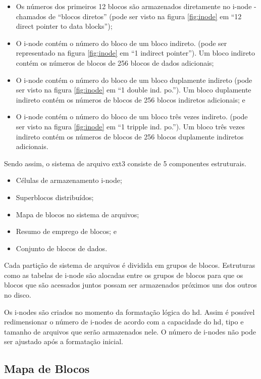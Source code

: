 \begin{itemize}
	\item Os números dos primeiros 12 blocos são armazenados diretamente no i-node - chamados de ``blocos diretos'' (pode ser visto na figura \ref{fig:inode} em ``12 direct pointer to data blocks'');
	\item O i-node contém o número do bloco de um bloco indireto. (pode ser representado na figura \ref{fig:inode} em ``1 indirect pointer''). Um bloco indireto contém os números de blocos de 256 blocos de dados adicionais;
	\item O i-node contém o número do bloco de um bloco duplamente indireto (pode ser visto na figura \ref{fig:inode} em ``1 double ind. po.''). Um bloco duplamente indireto contém os números de blocos de 256 blocos indiretos adicionais; e
	\item O i-node contém o número do bloco de um bloco três vezes indireto. (pode ser visto na figura \ref{fig:inode} em ``1 tripple ind. po.''). Um bloco três vezes indireto contém os números de blocos de 256 blocos duplamente indiretos adicionais.
\end{itemize}

Sendo assim, o sistema de arquivo ext3 consiste de 5 componentes estruturais.

\begin{itemize}
	\item Células de armazenamento i-node;
	\item Superblocos distribuídos;
	\item Mapa de blocos no sistema de arquivos;
	\item Resumo de emprego de blocos; e
	\item Conjunto de blocos de dados.
\end{itemize}

Cada partição de sistema de arquivos é dividida em grupos de blocos. Estruturas como as tabelas de i-node são alocadas entre os grupos de blocos para que os blocos que são acessados juntos possam ser armazenados próximos uns dos outros no disco.

Os i-nodes são criados no momento da formatação lógica do hd. Assim é possível redimensionar o número de i-nodes de acordo com a capacidade do hd, tipo e tamanho de arquivos que serão armazenados nele. O número de i-nodes não pode ser ajustado após a formatação inicial.

\subsection{Mapa de Blocos}

